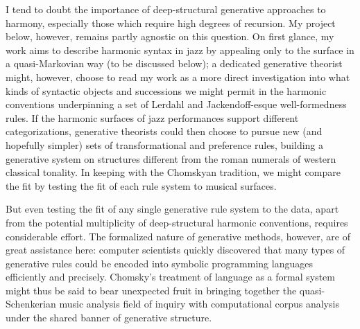 I tend to doubt the importance of deep-structural generative approaches to harmony, especially those which require high degrees of recursion.  My project below, however, remains partly agnostic on this question.  On first glance, my work aims to describe harmonic syntax in jazz by appealing only to the surface in a quasi-Markovian way (to be discussed below); a dedicated generative theorist might, however, choose to read my work as a more direct investigation into what kinds of syntactic objects and successions we might permit in the harmonic conventions underpinning a set of Lerdahl and Jackendoff-esque well-formedness rules.  If the harmonic surfaces of jazz performances support different categorizations, generative theorists could then choose to pursue new (and hopefully simpler) sets of transformational and preference rules, building a generative system on structures different from the roman numerals of western classical tonality.  In keeping with the Chomskyan tradition, we might compare the fit by testing the fit of each rule system to musical surfaces.

But even testing the fit of any single generative rule system to the data, apart from the potential multiplicity of deep-structural harmonic conventions, requires considerable effort.  The formalized nature of generative methods, however, are of great assistance here: computer scientists quickly discovered that many types of generative rules could be encoded into symbolic programming languages efficiently and precisely.  Chomsky's treatment of language as a formal system might thus be said to bear unexpected fruit in bringing together the quasi- Schenkerian music analysis field of inquiry with computational corpus analysis under the shared banner of generative structure.


